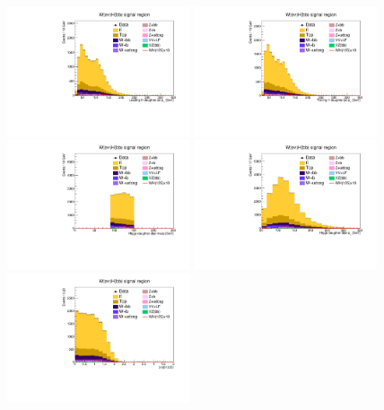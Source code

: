 \begin{figure}[tbp]
  \begin{center}
    \includegraphics[width=0.48\textwidth]{figures/wlnhbb2016/resolved/WenWHSR_Hbjet1Pt.pdf}
    \includegraphics[width=0.48\textwidth]{figures/wlnhbb2016/resolved/WenWHSR_Hbjet2Pt.pdf}
    \includegraphics[width=0.48\textwidth]{figures/wlnhbb2016/resolved/WenWHSR_mH.pdf}
    \includegraphics[width=0.48\textwidth]{figures/wlnhbb2016/resolved/WenWHSR_pTH.pdf}
    \includegraphics[width=0.48\textwidth]{figures/wlnhbb2016/resolved/WenWHSR_dEtab1b2.pdf}

\end{center}
\end{figure}
